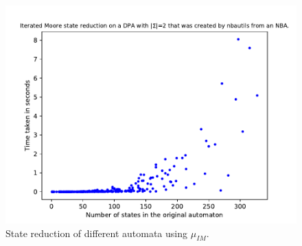 \begin{figure}
\begin{minipage}{0.49\textwidth}
		\includegraphics[page=2,height=.3\textheight]{../data/analysis/iterated_moore/detnbaut_ap1.pdf} 
		\caption{State reduction of different automata using $\mu_{IM}$.}
		\label{fig:imoore:empirical_reduct_abs}
	\end{minipage}
\end{figure}


